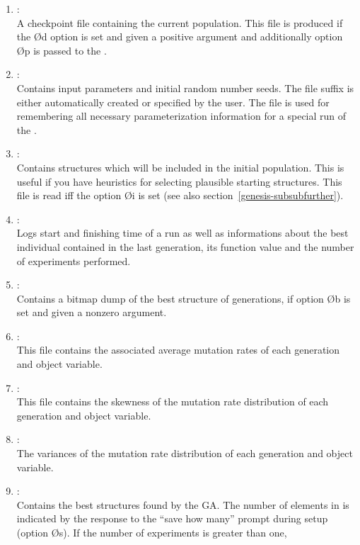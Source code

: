 \begin{enumerate}
%
\item	{}: 						\\
	A checkpoint file containing the current population.  
	This file is produced if the \O{d} option is set and given a positive
	argument and additionally option \O{p} is passed to the \GA.
%
\item	{}: 					\\
	Contains input parameters and initial  random  number seeds.  
	The file suffix is either automatically created or specified by
	the user.
	The file is used for remembering all necessary parameterization
	information for a special run of the \GA.
%
\item	{}: 						\\
	Contains structures which will be  included  in  the
       	initial  population.   
	This is useful if you have heuristics for selecting plausible 
	starting structures.  
	This  file  is read iff the option \O{i} is set
	(see also section~\ref{genesis-subsubfurther}).
%
\item	{}: 						\\
	Logs start and finishing  time of a run as well as informations
	about the best individual contained in the last generation, its
	function value and the number of experiments performed.
%
\item	{}:						\\
	Contains a bitmap dump of the best structure of generations,
	if option \O{b} is set and given a nonzero argument.
%
\item	{}:						\\
	This file contains the associated average mutation rates 
	of each generation and object variable.
%
\item	{}:						\\
	This file contains the skewness of the mutation rate distribution
	of each generation and object variable.
%
\item	{}:						\\
	The variances of the mutation rate distribution of each generation
	and object variable.
%
\item	{}: 						\\
	Contains the best structures found by the  GA.   
	The number  of elements in  is indicated by the response to
       	the ``save how many'' prompt during setup (option \O{s}).  
	If the  number  of experiments  is  greater  than  one, 

\end{enumerate}
